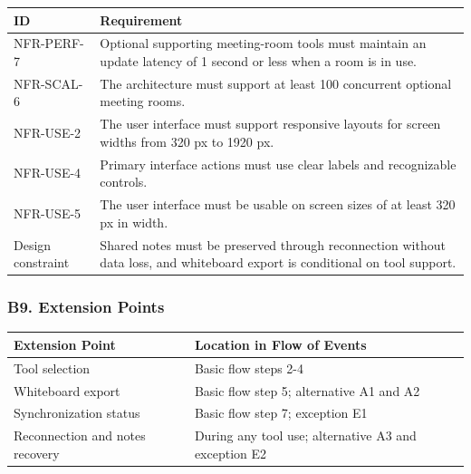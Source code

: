 \documentclass[12pt]{article}
\renewcommand{\baselinestretch}{1.5}
\begin{document}
\begingroup
\small
\renewcommand{\baselinestretch}{1.0}\selectfont
\renewcommand{\arraystretch}{1.15}
\setlength{\tabcolsep}{6pt}
\begin{longtable}{|>{\raggedright\arraybackslash}p{}|>{\raggedright\arraybackslash}p{}|}
\hline
\textbf{ID} & \textbf{Requirement} \\ \hline
\endhead
NFR-PERF-7 & Optional supporting meeting-room tools must maintain an update latency of 1 second or less when a room is in use. \\ \hline
NFR-SCAL-6 & The architecture must support at least 100 concurrent optional meeting rooms. \\ \hline
NFR-USE-2 & The user interface must support responsive layouts for screen widths from 320 px to 1920 px. \\ \hline
NFR-USE-4 & Primary interface actions must use clear labels and recognizable controls. \\ \hline
NFR-USE-5 & The user interface must be usable on screen sizes of at least 320 px in width. \\ \hline
Design constraint & Shared notes must be preserved through reconnection without data loss, and whiteboard export is conditional on tool support. \\ \hline
\end{longtable}
\endgroup
\par\medskip

\hypertarget{sec:b9-extension-points}{}
\subsubsection*{B9. Extension Points}
\par\medskip

\begingroup
\small
\renewcommand{\baselinestretch}{1.0}\selectfont
\renewcommand{\arraystretch}{1.15}
\setlength{\tabcolsep}{6pt}
\begin{longtable}{|>{\raggedright\arraybackslash}p{}|>{\raggedright\arraybackslash}p{}|}
\hline
\textbf{Extension Point} & \textbf{Location in Flow of Events} \\ \hline
\endhead
Tool selection & Basic flow steps 2-4 \\ \hline
Whiteboard export & Basic flow step 5; alternative A1 and A2 \\ \hline
Synchronization status & Basic flow step 7; exception E1 \\ \hline
Reconnection and notes recovery & During any tool use; alternative A3 and exception E2 \\ \hline
\end{longtable}
\endgroup
\par\medskip
\end{document}
